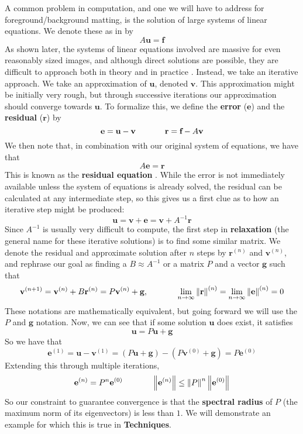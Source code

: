 A common problem in computation, and one we will have to address for foreground/background matting, is the solution of large systems of linear equations. We denote these as in \cite{briggs87} by
\[A\textbf{u}=\textbf{f}\]
As shown later, the systems of linear equations involved are massive for even reasonably sized images, and although direct solutions are possible, they are difficult to approach both in theory \cite[pg.4]{briggs87} and in practice \cite{lee14}. Instead, we take an iterative approach. We take an approximation of $\textbf{u}$, denoted $\textbf{v}$. This approximation might be initially very rough, but through successive iterations our approximation should converge towards $\textbf{u}$. To formalize this, we define the \textbf{error} ($\textbf{e}$) and the \textbf{residual} ($\textbf{r}$) by
\[\textbf{e}=\textbf{u}-\textbf{v}\hspace{.5in}
  \textbf{r}=\textbf{f}-A\textbf{v}\]
We then note that, in combination with our original system of equations, we have that
\[A\textbf{e}=\textbf{r}\]
This is known as the \textbf{residual equation} \cite{briggs87}. While the error is not immediately available unless the system of equations is already solved, the residual can be calculated at any intermediate step, so this gives us a first clue as to how an iterative step might be produced:
\[\textbf{u}=\textbf{v}+\textbf{e}=
	\textbf{v}+A^{-1}\textbf{r}\]
Since $A^{-1}$ is usually very difficult to compute, the first step in \textbf{relaxation} (the general name for these iterative solutions) is to find some similar matrix. We denote the residual and approximate solution after $n$ steps by $\textbf{r}^{(n)}$ and $\textbf{v}^{(n)}$, and rephrase our goal as finding a $B\approx A^{-1}$ or a matrix $P$ and a vector $\textbf{g}$ such that
\[\textbf{v}^{(n+1)}=\textbf{v}^{(n)}+B\textbf{r}^{(n)}
	=P\textbf{v}^{(n)}+\textbf{g},
\hspace{.5in}
	\lim\limits_{n\to\infty}
		\left\Vert\textbf{r}\right\Vert^{(n)}=
	\lim\limits_{n\to\infty}
	\left\Vert\textbf{e}\right\Vert^{(n)}=0\]
These notations are mathematically equivalent, but going forward we will use the $P$ and $\textbf{g}$ notation. Now, we can see that if some solution $\textbf{u}$ does exist, it satisfies
\[\textbf{u}=P\textbf{u}+\textbf{g}\]
So we have that
\[\textbf{e}^{(1)}=\textbf{u}-\textbf{v}^{(1)}
=(P\textbf{u}+\textbf{g})-(P\textbf{v}^{(0)}+\textbf{g})
=P\textbf{e}^{(0)}\]
Extending this through multiple iterations,
\[\textbf{e}^{(n)}=P^n\textbf{e}^{(0)}\hspace{.5in}
\left\Vert\textbf{e}^{(n)}\right\Vert\leq
\left\Vert P\right\Vert^n
	\left\Vert\textbf{e}^{(0)}\right\Vert\]
So our constraint to guarantee convergence is that the \textbf{spectral radius} of $P$ (the maximum norm of its eigenvectors) is less than $1$. We will demonstrate an example for which this is true in \textbf{Techniques}.
